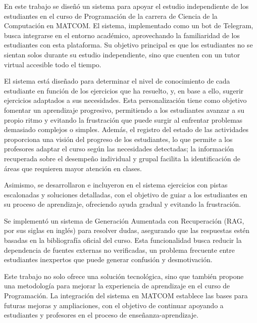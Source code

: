 \begin{conclusions}
En este trabajo se diseñó un sistema para apoyar el estudio independiente de los estudiantes en el curso de Programación de la carrera de Ciencia de la Computación en MATCOM. El sistema, implementado como un bot de Telegram, busca integrarse en el entorno académico, aprovechando la familiaridad de los estudiantes con esta plataforma. Su objetivo principal es que los estudiantes no se sientan solos durante su estudio independiente, sino que cuenten con un tutor virtual accesible todo el tiempo.

El sistema está diseñado para determinar el nivel de conocimiento de cada estudiante en función de los ejercicios que ha resuelto, y, en base a ello, sugerir ejercicios adaptados a sus necesidades. Esta personalización tiene como objetivo fomentar un aprendizaje progresivo, permitiendo a los estudiantes avanzar a su propio ritmo y evitando la frustración que puede surgir al enfrentar problemas demasiado complejos o simples. Además, el registro del estado de las actividades proporciona una visión del progreso de los estudiantes, lo que permite a los profesores adaptar el curso según las necesidades detectadas; la información recuperada sobre el desempeño individual y grupal facilita la identificación de áreas que requieren mayor atención en clases.

Asimismo, se desarrollaron e incluyeron en el sistema ejercicios con pistas escalonadas y soluciones detalladas, con el objetivo de guiar a los estudiantes en su proceso de aprendizaje, ofreciendo ayuda gradual y evitando la frustración.

Se implementó un sistema de Generación Aumentada con Recuperación (RAG, por sus siglas en inglés) para resolver dudas, asegurando que las respuestas estén basadas en la bibliografía oficial del curso. Esta funcionalidad busca reducir la dependencia de fuentes externas no verificadas, un problema frecuente entre estudiantes inexpertos que puede generar confusión y desmotivación.

Este trabajo no solo ofrece una solución tecnológica, sino que también propone una metodología para mejorar la experiencia de aprendizaje en el curso de Programación. La integración del sistema en MATCOM establece las bases para futuras mejoras y ampliaciones, con el objetivo de continuar apoyando a estudiantes y profesores en el proceso de enseñanza-aprendizaje.
\end{conclusions}
